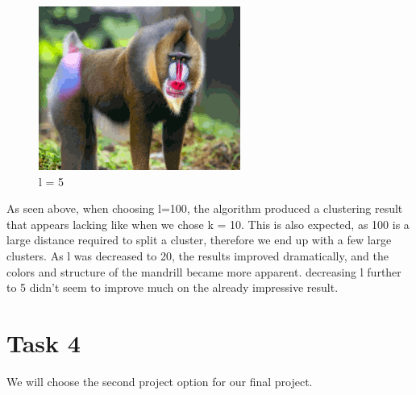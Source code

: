 \documentclass[12pt]{article}
\begin{document}
\begin{figure}[!h]
        \begin{minipage}{0.5\textwidth}
        \centering
        \includegraphics[]{images/monkey_clustered_pdc_dp_means_l_5}
        \caption{l = 5}
        \end{minipage}\label{fig:figure8}
	\end{figure}
    As seen above, when choosing l=100, the algorithm produced a clustering result that appears lacking like when we chose k = 10.
    This is also expected, as 100 is a large distance required to split a cluster, therefore we end up with a few large clusters.
    As l was decreased to 20, the results improved dramatically, and the colors and structure of the mandrill became more apparent.
    decreasing l further to 5 didn't seem to improve much on the already impressive result.

    \section*{Task 4}\label{sec:task-4}
    We will choose the second project option for our final project.
\end{document}
